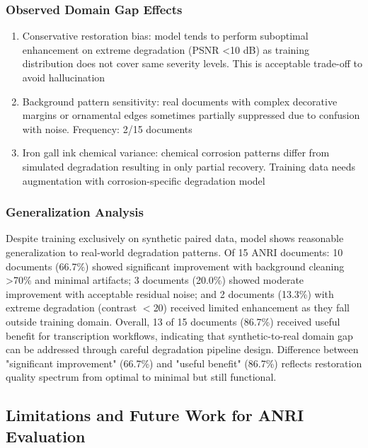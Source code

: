 \documentclass[journal]{IEEEtran}
\begin{document}
\subsubsection{Observed Domain Gap Effects}
\begin{enumerate}
    \item Conservative restoration bias: model tends to perform suboptimal enhancement on extreme degradation (PSNR <10 dB) as training distribution does not cover same severity levels. This is acceptable trade-off to avoid hallucination
    
    \item Background pattern sensitivity: real documents with complex decorative margins or ornamental edges sometimes partially suppressed due to confusion with noise. Frequency: 2/15 documents
    
    \item Iron gall ink chemical variance: chemical corrosion patterns differ from simulated degradation resulting in only partial recovery. Training data needs augmentation with corrosion-specific degradation model
\end{enumerate}

\subsubsection{Generalization Analysis}
Despite training exclusively on synthetic paired data, model shows reasonable generalization to real-world degradation patterns. Of 15 ANRI documents: 10 documents (66.7\%) showed significant improvement with background cleaning >70\% and minimal artifacts; 3 documents (20.0\%) showed moderate improvement with acceptable residual noise; and 2 documents (13.3\%) with extreme degradation (contrast $<$20) received limited enhancement as they fall outside training domain. Overall, 13 of 15 documents (86.7\%) received useful benefit for transcription workflows, indicating that synthetic-to-real domain gap can be addressed through careful degradation pipeline design. Difference between "significant improvement" (66.7\%) and "useful benefit" (86.7\%) reflects restoration quality spectrum from optimal to minimal but still functional.

\subsection{Limitations and Future Work for ANRI Evaluation}
\end{document}

